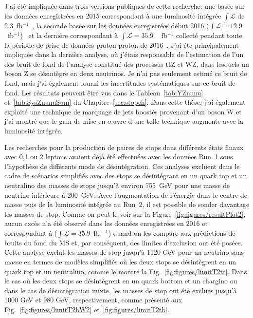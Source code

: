 J'ai été impliquée dans trois versions publiques de cette recherche: une basée sur les données enregistrées en 2015 correspondant à une luminosité intégrée $\int{\mathcal{L}} $ de 2.3~fb$^{-1}$~\cite{Sirunyan:2016jpr}, la seconde basée sur les données enregistrées début 2016 ($\int{\mathcal {L}} = 12.9 $~fb$^{-1} $)~\cite{CMS:2016vew} et la dernière correspondant à $ \int{\mathcal {L}} = 35.9 $ ~ fb$^{-1} $ collecté pendant toute la période de prise de données proton-proton de 2016~\cite{Sirunyan:2017xse}. J'ai été principalement impliquée dans la dernière analyse, où j'étais responsable de l'estimation de l'un des bruit de fond de l'analyse constitué des processus ttZ et WZ, dans lesquels un boson Z se désintègre en deux neutrinos. Je n’ai pas seulement estimé ce bruit de fond, mais j’ai également fourni les incertitudes systématiques sur ce bruit de fond. Les résultats peuvent être vus dans le Tableau~\ref{tab:YZnunu} et~\ref{tab:SysZnunuSum} du Chapitre~\ref{sec:stopch}. Dans cette thèse, j'ai également exploité une technique de marquage de jets boostés provenant d'un boson W et j'ai montré que le gain de mise en œuvre d'une telle technique augmente avec la luminosité intégrée.


Les recherches pour la production de paires de stops dans différents états finaux avec 0,1 ou 2 leptons avaient déjà été effectuées avec les données Run~1 sous l'hypothèse de différents mode de désintégration. Ces analyses excluent dans le cadre de scénarios simplifiés avec des stops se désintégrant en un quark top et un neutralino des masses de stops jusqu'à environ 755~GeV pour une masse de neutrino inférieure à 200~GeV. Avec l'augmentation de l'énergie dans le centre de masse puis de la luminosité intégrée au Run~2, il est possible de sonder davantage les masses de stop. Comme on peut le voir sur la Figure~\ref{fig:figures/resultPlot2}, aucun excès n'a été observé dans les données enregistrées en 2016 et correspondant à ($ \int{\mathcal {L}} = 35.9 $~fb $^{-1} $) quand on les compare aux prédictions de bruits du fond du MS et, par conséquent, des limites d'exclusion ont été posées. Cette analyse exclut les masses de stop jusqu’à 1120 GeV pour un neutrino sans masse en termes de modèles simplifiés où les deux stops se désintègrent en un quark top et un neutralino, comme le montre la Fig.~\ref{fig:figures/limitT2tt}. Dans le cas où les deux stops se désintègrent en un quark bottom et un chargino ou dans le cas de désintégration mixte, les masses de stop ont été exclues jusqu’à 1000 GeV et 980 GeV, respectivement, comme présenté aux Fig.~\ref{fig:figures/limitT2bW2}  et~\ref{fig:figures/limitT2tb}.

